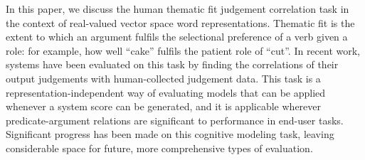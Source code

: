 In this paper, we discuss the human thematic fit judgement correlation task in the context of real-valued vector space word representations. Thematic fit is the extent to which an argument fulfils the selectional preference of a verb given a role: for example, how well ``cake'' fulfils the patient role of ``cut''.  In recent work, systems have been evaluated on this task by finding the correlations of their output judgements with human-collected judgement data.  This task is a representation-independent way of evaluating models that can be applied whenever a system score can be generated, and it is applicable wherever predicate-argument relations are significant to performance in end-user tasks. Significant progress has been made on this cognitive modeling task, leaving considerable space for future, more comprehensive types of evaluation.

